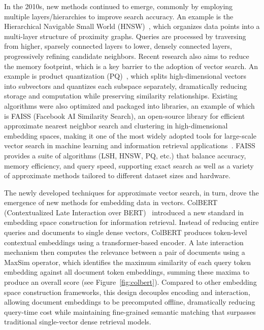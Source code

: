 \documentclass[twoside,a4paper]{master}
\begin{document}
In the 2010s, new methods continued to emerge, commonly by employing multiple layers/hierarchies to improve search accuracy. An example is the Hierarchical Navigable Small World (HNSW)~\cite{10.1109/TPAMI.2018.2889473}, which organizes data points into a multi-layer structure of proximity graphs. Queries are processed by traversing from higher, sparsely connected layers to lower, densely connected layers, progressively refining candidate neighbors. Recent research also aims to reduce the memory footprint, which is a key barrier to the adoption of vector search. An example is product quantization (PQ)~\cite{10.1109/TPAMI.2010.57}, which splits high-dimensional vectors into subvectors and quantizes each subspace separately, dramatically reducing storage and computation while preserving similarity relationships. Existing algorithms were also optimized and packaged into libraries, an example of which is FAISS (Facebook AI Similarity Search), an open-source library for efficient approximate nearest neighbor search and clustering in high-dimensional embedding spaces, making it one of the most widely adopted tools for large-scale vector search in machine learning and information retrieval applications~\cite{douze2025faiss}. FAISS provides a suite of algorithms (LSH, HNSW, PQ, etc.) that balance accuracy, memory efficiency, and query speed, supporting exact search as well as a variety of approximate methods tailored to different dataset sizes and hardware.

The newly developed techniques for approximate vector search, in turn, drove the emergence of new methods for embedding data in vectors. ColBERT (Contextualized Late Interaction over BERT)~\cite{khattab2020colbertefficienteffectivepassage} introduced a new standard in embedding space construction for information retrieval. Instead of reducing entire queries and documents to single dense vectors, ColBERT produces token-level contextual embeddings using a transformer-based encoder. A late interaction mechanism then computes the relevance between a pair of documents using a MaxSim operator, which identifies the maximum similarity of each query token embedding against all document token embeddings, summing these maxima to produce an overall score (see Figure~\ref{fig:colbert}). Compared to other embedding space construction frameworks, this design decouples encoding and interaction, allowing document embeddings to be precomputed offline, dramatically reducing query-time cost while maintaining fine-grained semantic matching that surpasses traditional single-vector dense retrieval models.
\end{document}
